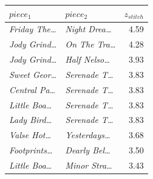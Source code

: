 \begin{tabular}{llr}
\toprule
$piece_1$ & $piece_2$ & $z_{stitch}$ \\
\midrule
\textit{Friday The\dots} & \textit{Night Drea\dots} & 4.59 \\
\textit{Jody Grind\dots} & \textit{On The Tra\dots} & 4.28 \\
\textit{Jody Grind\dots} & \textit{Half Nelso\dots} & 3.93 \\
\textit{Sweet Geor\dots} & \textit{Serenade T\dots} & 3.83 \\
\textit{Central Pa\dots} & \textit{Serenade T\dots} & 3.83 \\
\textit{Little Boa\dots} & \textit{Serenade T\dots} & 3.83 \\
\textit{Lady Bird\dots} & \textit{Serenade T\dots} & 3.83 \\
\textit{Valse Hot\dots} & \textit{Yesterdays\dots} & 3.68 \\
\textit{Footprints\dots} & \textit{Dearly Bel\dots} & 3.50 \\
\textit{Little Boa\dots} & \textit{Minor Stra\dots} & 3.43 \\
\bottomrule
\end{tabular}
